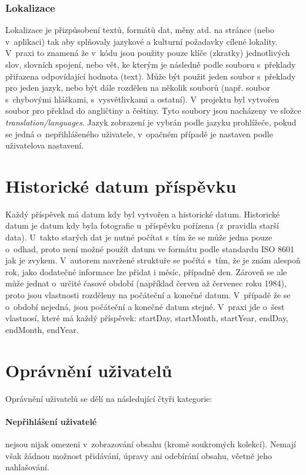 \documentclass[12pt, a4paper,
  oneside,      %
]{report}
\begin{document}
\subsubsection{Lokalizace}
Lokalizace je přizpůsobení textů, formátů dat, měny atd. na stránce (nebo v~aplikaci) tak aby splňovaly jazykové a kulturní požadavky cílené lokality. V~praxi to znamená že v~kódu jsou použity pouze klíče (zkratky) jednotlivých slov, slovních spojení, nebo vět, ke kterým je následně podle souboru s~překlady přiřazena odpovídající hodnota (text). Může být použit jeden soubor s~překlady pro jeden jazyk, nebo být dále rozdělen na několik souborů (např. soubor s~chybovými hláškami, s~vysvětlivkami a ostatní). V~projektu byl vytvořen soubor pro překlad do angličtiny a češtiny. Tyto soubory jsou nacházeny ve složce \textit{translation/languages}. Jazyk zobrazení je vybrán podle jazyku prohlížeče, pokud se jedná o~nepřihlášeného uživatele, v~opačném případě je nastaven podle uživatelova nastavení. \cite{internationalizationVsLocalization}
\section{Historické datum příspěvku}\label{section:historical_date}
Každý příspěvek má datum kdy byl vytvořen a historické datum. Historické datum je datum kdy byla fotografie u~příspěvku pořízena (z~pravidla starší data). U~takto starých dat je nutné počítat s~tím že se může jedna pouze o~odhad, proto není možné použít datum ve formátu podle standardu ISO 8601 jak je zvykem. V~autorem navržené struktuře se počítá s~tím, že je znám alespoň rok, jako dodatečné informace lze přidat i měsíc, případně den. Zároveň se ale může jednat o~určité časové období (například červen až červenec roku 1984), proto jsou vlastnosti rozděleny na počáteční a konečné datum. V~případě že se o~období nejedná, jsou počáteční a konečné datum stejné. V~praxi jde o~šest vlastnosí, které má každý příspěvek: startDay, startMonth, startYear, endDay, endMonth, endYear.

\section{Oprávnění uživatelů}
Oprávnění uživatelů se dělí na následující čtyři kategorie:
\paragraph{Nepřihlášení uživatelé} nejsou nijak omezeni v~zobrazování obsahu (kromě soukromých kolekcí). Nemají však žádnou možnost přidávání, úpravy ani odebírání obsahu, včetně jeho nahlašování.
\end{document}
